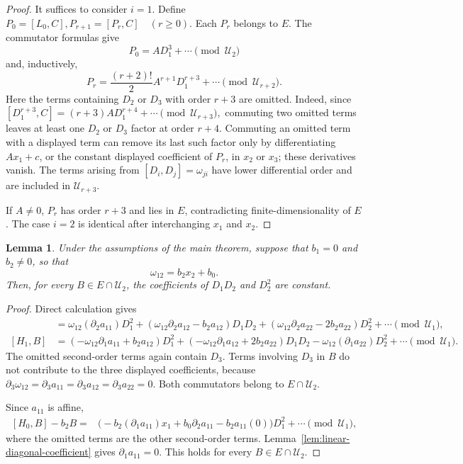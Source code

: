 \documentclass{tCON2e}
\newenvironment{revision}{\begingroup\color{black}}{\endgroup}
\numberwithin{equation}{section}
\theoremstyle{journalplain}
\newtheorem{lemma}[theorem]{Lemma}
\theoremstyle{journaldef}
\newenvironment{revision}{}{}
\begin{document}
\begin{revision}
\begin{proof}
It suffices to consider $i=1$. Define
\(
P_0=[L_0,C], P_{r+1}=[P_r,C]\quad(r\geq0).
\)
Each $P_r$ belongs to $E$. The commutator formulas give
\[
P_0=AD_1^3+\cdots\pmod{\mathcal U_2}
\]
and, inductively,
\[
P_r=\frac{(r+2)!}{2}A^{r+1}D_1^{r+3}
     +\cdots\pmod{\mathcal U_{r+2}}.
\]
Here the terms containing $D_2$ or $D_3$ with order $r+3$ are omitted.
Indeed, since
\(
[D_1^{r+3},C]
=(r+3)A D_1^{r+4}+\cdots\pmod{\mathcal U_{r+3}},
\)
commuting two omitted terms leaves at least one $D_2$ or $D_3$
factor at order $r+4$. Commuting an omitted term with a displayed
term can remove its last such factor only by differentiating
$Ax_1+c$, or the constant displayed coefficient of $P_r$, in
$x_2$ or $x_3$; these derivatives vanish. The terms arising from
$[D_i,D_j]=\omega_{ji}$ have lower differential order and are
included in $\mathcal U_{r+3}$.

If $A\ne0$, $P_r$ has order $r+3$ and lies in $E$, contradicting finite-dimensionality
of $E$. The case $i=2$ is identical after interchanging $x_1$ and $x_2$.
\end{proof}

\begin{lemma}\label{lem:constant-quadratic-coefficients}
Under the assumptions of the main theorem, suppose that
$b_1=0$ and $b_2\ne0$, so that
\[
\omega_{12}=b_2x_2+b_0.
\]
Then, for every $B\in E\cap\mathcal U_2$, the coefficients of $D_1D_2$
and $D_2^2$ are constant.
\end{lemma}

\begin{proof}
Direct calculation gives
\begin{align*}
[H_0,B]
&=\omega_{12}(\partial_2a_{11})D_1^2
 +(\omega_{12}\partial_2a_{12}-b_2a_{12})D_1D_2
 +(\omega_{12}\partial_2a_{22}-2b_2a_{22})D_2^2
 +\cdots\pmod{\mathcal U_1},\\
[H_1,B]
&=(-\omega_{12}\partial_1a_{11}+b_2a_{12})D_1^2
 +(-\omega_{12}\partial_1a_{12}+2b_2a_{22})D_1D_2
 -\omega_{12}(\partial_1a_{22})D_2^2
 +\cdots\pmod{\mathcal U_1}.
\end{align*}
The omitted second-order terms again contain $D_3$.
Terms involving $D_3$ in $B$ do not contribute to the three
displayed coefficients, because
$\partial_3\omega_{12}=\partial_3a_{11}
=\partial_3a_{12}=\partial_3a_{22}=0$.
Both commutators belong to $E\cap\mathcal U_2$.

Since $a_{11}$ is affine,
\[
\begin{aligned}
{}[H_0,B]-b_2B
={}&\bigl(-b_2(\partial_1a_{11})x_1
       +b_0\partial_2a_{11}-b_2a_{11}(0)\bigr)D_1^2+\cdots\pmod{\mathcal U_1},
\end{aligned}
\]
where the omitted terms are the other second-order terms.
Lemma~\ref{lem:linear-diagonal-coefficient} gives
$\partial_1a_{11}=0$. This holds for every
$B\in E\cap\mathcal U_2$.


\end{proof}
\end{revision}
\end{document}
